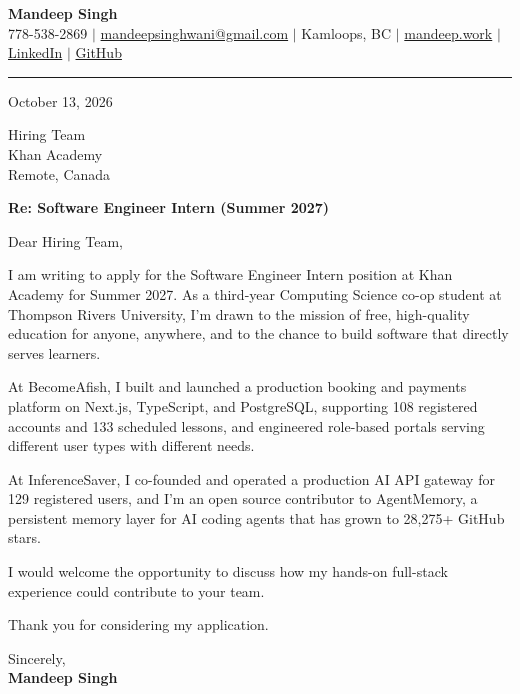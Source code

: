 \documentclass[letterpaper,11pt]{article}
\begin{document}
\begin{center}
    \textbf{\LARGE Mandeep Singh} \\ \vspace{2pt}
    \small 778-538-2869 $|$
    \href{mailto:mandeepsinghwani@gmail.com}{mandeepsinghwani@gmail.com} $|$
    Kamloops, BC $|$
    \href{https://mandeep.work}{mandeep.work} $|$
    \href{https://www.linkedin.com/in/mandeep-singh-b855972a7/}{LinkedIn} $|$
    \href{https://github.com/deepmroot}{GitHub}
\end{center}

\vspace{4pt}
\hrule
\vspace{14pt}

October 13, 2026

\vspace{8pt}
Hiring Team \\
Khan Academy \\
Remote, Canada

\vspace{8pt}
\textbf{Re: Software Engineer Intern (Summer 2027)}

\vspace{10pt}
Dear Hiring Team,

\vspace{4pt}
I am writing to apply for the Software Engineer Intern position at Khan Academy for Summer 2027. As a third-year Computing Science co-op student at Thompson Rivers University, I'm drawn to the mission of free, high-quality education for anyone, anywhere, and to the chance to build software that directly serves learners.

At BecomeAfish, I built and launched a production booking and payments platform on Next.js, TypeScript, and PostgreSQL, supporting 108 registered accounts and 133 scheduled lessons, and engineered role-based portals serving different user types with different needs.

At InferenceSaver, I co-founded and operated a production AI API gateway for 129 registered users, and I'm an open source contributor to AgentMemory, a persistent memory layer for AI coding agents that has grown to 28,275+ GitHub stars.

I would welcome the opportunity to discuss how my hands-on full-stack experience could contribute to your team.

Thank you for considering my application.

\vspace{16pt}
Sincerely, \\
\vspace{6pt}
\textbf{Mandeep Singh}
\end{document}

